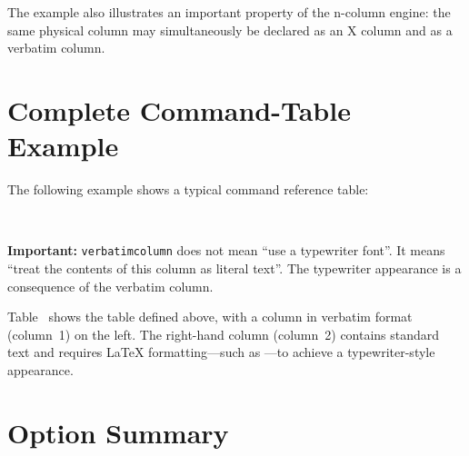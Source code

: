 \documentclass[
11pt,
a4paper,
oneside
]{scrbook}
\begin{document}


The example also illustrates an important property of the n-column engine:
the same physical column may simultaneously be declared as an X column and
as a verbatim column.


\section{Complete Command-Table Example}

The following example shows a typical command reference table:

\begin{SynchronizedMarginAndTextArea}
	\begin{TextInMarginArea}
		{\centering{}\\[1ex]}
		
		\textbf{Important:}
		\texttt{verbatimcolumn} does not mean ``use a typewriter font''.
		It means ``treat the contents of this column as literal text''.
		The typewriter appearance is a consequence of the verbatim column.
	\end{TextInMarginArea}




\end{SynchronizedMarginAndTextArea}





Table~ shows the table defined above, with a
column in verbatim format (column~1) on the left. The right-hand column
(column~2) contains standard text and requires \LaTeX{} formatting---such as
---to achieve a typewriter-style appearance.



\section{Option Summary}

%
\end{document}
